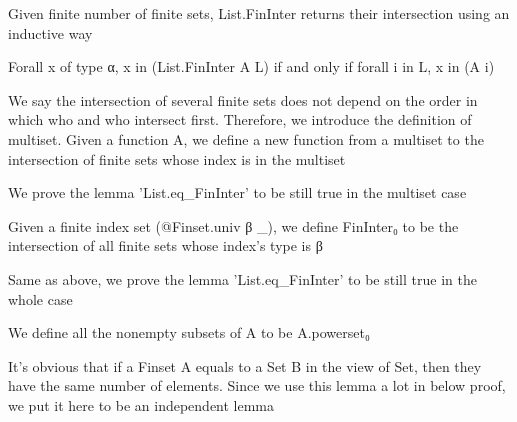 
\begin{definition}\label{List.FinInter}
        \leanok
                Given finite number of finite sets, List.FinInter returns their intersection using an inductive way
    \end{definition}

\begin{lemma}\label{List.eq_FinInter}
                Forall x of type α, x in (List.FinInter A L) if and only if forall i in L, x in (A i)
    \end{lemma}

\begin{definition}\label{Multiset.FinInter}
                We say the intersection of several finite sets does not depend on the order in which who and who intersect first. Therefore, we introduce the definition of multiset. Given a function A, we define a new function from a multiset to the intersection of finite sets whose index is in the multiset
    \end{definition}

\begin{lemma}\label{Multiset.eq_FinInter}
                We prove the lemma 'List.eq_FinInter' to be still true in the multiset case
    \end{lemma}

\begin{definition}\label{FinInter₀}
                Given a finite index set (@Finset.univ β _), we define FinInter₀ to be the intersection of all finite sets whose index's type is β
    \end{definition}

\begin{lemma}\label{eq_FinInter₀}
                Same as above, we prove the lemma 'List.eq_FinInter' to be still true in the whole case
    \end{lemma}

\begin{definition}\label{Finset.powerset₀}
        \leanok
                We define all the nonempty subsets of A to be A.powerset₀
    \end{definition}

\begin{lemma}\label{card_eq}
                It's obvious that if a Finset A equals to a Set B in the view of Set, then they have the same number of elements. Since we use this lemma a lot in below proof, we put it here to be an independent lemma
    \end{lemma}

